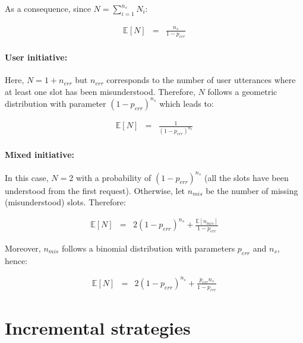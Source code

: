                      As a consequence, since $N = \sum_{i=1}^{n_s} N_i$:

                     \begin{eqnarray}
                       \mathbb{E} [N] & = & \frac{n_s}{1-p_{err}}
                     \end{eqnarray}

                \paragraph{User initiative:} Here, $N = 1 + n_{err}$  but $n_{err}$ corresponds to the number of user utterances where at least one slot has been misunderstood. Therefore, $N$ follows a geometric distribution with parameter $(1-p_{err})^{n_s}$ which leads to:

                     \begin{eqnarray}
                       \mathbb{E} [N] & = & \frac{1}{(1-p_{err})^{n_s}}
                     \end{eqnarray}

                \paragraph{Mixed initiative:} In this case, $N=2$ with a probability of $(1-p_{err})^{n_s}$ (all the slots have been understood from the first request). Otherwise, let $n_{mis}$ be the number of missing (misunderstood) slots. Therefore:

                     \begin{eqnarray}
                       \mathbb{E} [N] & = & 2 (1-p_{err})^{n_s} + \frac{\mathbb{E} [n_{mis}]}{1-p_{err}}
                     \end{eqnarray}

                     Moreover, $n_{mis}$ follows a binomial distribution with parameters $p_{err}$ and $n_s$, hence:

                     \begin{eqnarray}
                       \mathbb{E} [N] & = & 2 (1-p_{err})^{n_s} + \frac{p_{err} n_s}{1-p_{err}}
                     \end{eqnarray}

\section{Incremental strategies}
\label{sec:incrstrat}
